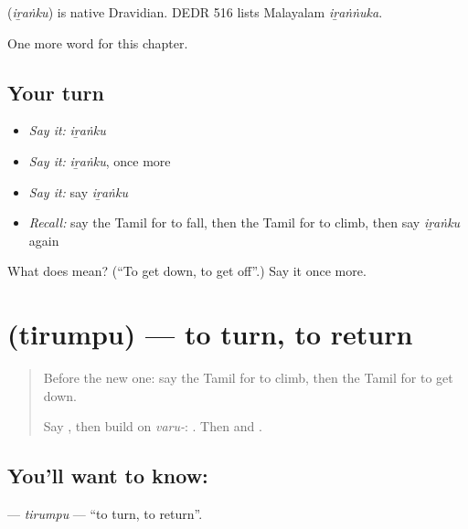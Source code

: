 \begin{cousinweb}
\textbf{} (\emph{iṟaṅku}) is native Dravidian. DEDR 516 lists Malayalam \emph{iṟaṅṅuka}.
\end{cousinweb}

\begin{grammarlens}[title={What you've built}]
One more word for this chapter.
\end{grammarlens}

\subsection*{Your turn}
\begin{itemize}
\raggedright
  \item \emph{Say it:} \emph{iṟaṅku}
  \item \emph{Say it:} \emph{iṟaṅku}, once more
  \item \emph{Say it:} say \emph{iṟaṅku}
  \item \emph{Recall:} say the Tamil for to fall, then the Tamil for to climb, then say \emph{iṟaṅku} again
\end{itemize}

\begin{tcolorbox}[breakable,colback=teal!4,colframe=teal!35!black,title={Before you move on}]
What does  mean? (\textquotedblleft{}To get down, to get off\textquotedblright{}.) Say it once more.
\end{tcolorbox}
\section[\texorpdfstring{\ta{திரும்பு} (tirumpu)}{திரும்பு (tirumpu)}]{ (tirumpu) — to turn, to return}

\label{lesson:TA-C153-tirumpu}



\begin{quote}
Before the new one: say the Tamil for to climb, then the Tamil for to get down.

Say \textbf{}, then build on \emph{varu-}: \textbf{}. Then \textbf{} and \textbf{}.
\end{quote}

\subsection*{You'll want to know: }
\textbf{} — \emph{tirumpu} — \textquotedblleft{}to turn, to return\textquotedblright{}.

